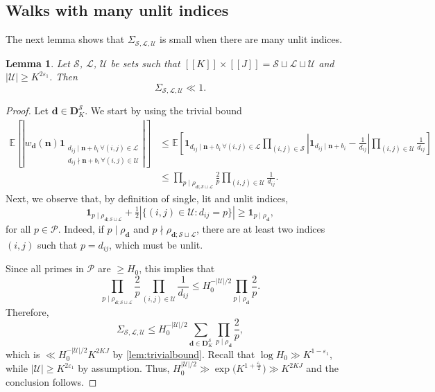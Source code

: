 \documentclass[11pt]{amsart}
\newtheorem{lemma}[theorem]{Lemma}
\theoremstyle{definition}
\renewcommand{\leq}{\leqslant}
\renewcommand{\geq}{\geqslant}
\newcommand{\sinterval}[1]{[\![#1]\!] }
\newcommand{\abs}[1]{\left|#1\right|}
\newcommand{\ind}[1]{\mathbf{1}_{#1}}
\newcommand{\eps}{\varepsilon}
\newcommand{\E}{\mathbb{E}}
\newcommand{\primes}{\mathcal{P}}
\renewcommand{\d}{\boldsymbol{d}}
\newcommand{\pcomp}[2]{d_{#1#2}}
\newcommand{\n}{\mathbf{n}}
\newcommand{\cstH}{\eps_1}
\newcommand{\cstU}{2\eps_1}
\newcommand{\sommespart}{b}
\newcommand{\fprod}[1]{\rho_{#1}}
\newcommand{\pall}{\fprod{\d}}
\newcommand{\lit}{\mathcal{L}}
\newcommand{\unlit}{\mathcal{U}}
\newcommand{\s}{\mathcal{S}}
\newcommand{\fancyD}{\mathbf{D}}
\newcommand{\Ds}{\fancyD^{\s}_{\!\repK}}
\newcommand{\repR}{J}
\newcommand{\repK}{K}
\newcommand{\newK}{\sinterval{K}}
\newcommand{\newR}{\sinterval{J}}
\newcommand{\newerKR}{\newK\times\newR}
\begin{document}
\subsection{Walks with many unlit indices}
\label{sec:unlit}

The next lemma shows that $\Sigma_{\s,\lit,\unlit}$ is small when there are many unlit indices.
\begin{lemma}
\label{lem:unlit}
Let $\s$, $\lit$, $\unlit$ be sets such that $\newerKR = \s\sqcup\lit\sqcup\unlit$ and $|\unlit|\geq \repK^{\cstU}$. Then
\begin{equation*}
\Sigma_{\s,\lit,\unlit} \ll 1.
\end{equation*}
\end{lemma}

\begin{proof}
Let $\d\in \Ds$. We start by using the trivial bound
\begin{align*}
\E \left[\abs{w_{\d}(\n) \ind{\substack{\pcomp{i}{j}\mid \n+\sommespart_i \, \forall (i,j)\in \lit \\ \pcomp{i}{j}\nmid \n+\sommespart_i \, \forall (i,j)\in \unlit}}} \right] 
&\leq \E \left[\ind{\pcomp{i}{j}\mid \n+\sommespart_i \, \forall (i,j)\in \lit }  \prod_{(i,j)\in \s} \abs{\ind{\pcomp{i}{j}\mid \n + \sommespart_i} - \frac{1}{\pcomp{i}{j}}}  \prod_{(i,j)\in \unlit}\frac{1}{\pcomp{i}{j}}\right] \\
&\leq \prod_{p\mid \fprod{\d;\s \sqcup \lit}} \frac{2}{p} \prod_{(i,j)\in \unlit}\frac{1}{\pcomp{i}{j}}.
\end{align*}
Next, we observe that, by definition of single, lit and unlit indices,
\begin{equation*}
	\ind{p\mid  \fprod{\d; \s \sqcup \lit}} + \tfrac12 \abs{\{(i,j)\in \unlit : \pcomp{i}{j} = p\}} \geq \ind{p\mid \pall},
\end{equation*}
for all $p\in \primes$. Indeed, if $p\mid \pall$ and $p\nmid \fprod{\d; \s \sqcup \lit}$, there are at least two indices $(i,j)$ such that $p = \pcomp{i}{j}$, which must be unlit. 

Since all primes in $\primes$ are $\geq H_0$, this implies that
\begin{equation*}
\prod_{p\mid \fprod{\d; \s \sqcup \lit}} \frac{2}{p} \prod_{(i,j)\in \unlit}\frac{1}{\pcomp{i}{j}} \leq H_0^{-|\unlit|/2} \prod_{p\mid \pall} \frac{2}{p}.
\end{equation*}
Therefore, 
\begin{equation*}
\Sigma_{\s,\lit,\unlit} \leq  H_0^{-|\unlit|/2} \sum_{\d\in \Ds} \prod_{p\mid \pall} \frac{2}{p},
\end{equation*}
which is $\ll H_0^{-|\unlit|/2}\repK^{2\repK \repR}$ by \cref{lem:trivialbound}. Recall that ${\log H_0 \gg\repK^{1-\cstH}}$, while ${|\unlit|\geq\repK^{\cstU}}$ by assumption. Thus, $H_0^{|\unlit|/2} \gg \exp\big(\repK^{1+\tfrac{\cstH}{2}}\big) \gg \repK^{2\repK \repR}$ and the conclusion follows.
\end{proof}
\end{document}
